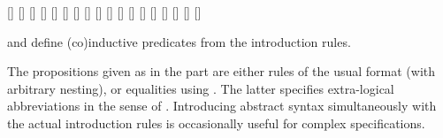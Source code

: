 \begin{isabellebody}
\begin{isamarkuptext}
  \begin{railoutput}
\rail@bar
{}[]
[]
[]
[]
\rail@endbar
\rail@bar
{}
[]
\rail@endbar
{}
[]
\rail@bar
{}
[]
[]
\rail@endbar
\rail@bar
{}
[]
[]
\rail@endbar
{}
\rail@bar
{}
[]
[]
\rail@endbar
\rail@end
{}
\rail@plus
\rail@bar
{}
[]
\rail@endbar
{}[]
[]
\rail@endplus
\rail@end
{}
[]
\rail@bar
{}
[]
[]
\rail@endbar
\rail@end
\end{railoutput}


  \begin{description}

  \item \hyperlink{command.HOL.inductive}{\mbox{}} and \hyperlink{command.HOL.coinductive}{\mbox{}} define (co)inductive predicates from the introduction
  rules.

  The propositions given as  in the \hyperlink{keyword.where}{\mbox{}} part are either rules of the usual  format
  (with arbitrary nesting), or equalities using .  The
  latter specifies extra-logical abbreviations in the sense of
  \hyperlink{command.abbreviation}{\mbox{}}.  Introducing abstract syntax
  simultaneously with the actual introduction rules is occasionally
  useful for complex specifications.


\end{description}
\end{isamarkuptext}
\end{isabellebody}
